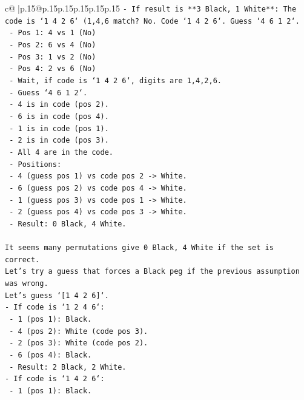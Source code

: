 \documentclass{article}
\begin{document}
{\begin{supertabular}{c@{$\;$}|p{.15\linewidth}@{}p{.15\linewidth}p{.15\linewidth}p{.15\linewidth}p{.15\linewidth}p{.15\linewidth}}
{{{\texttt{{-} If result is **3 Black, 1 White**: The code is `1 4 2 6` (1,4,6 match? No. Code `1 4 2 6`. Guess `4 6 1 2`.} \\
\texttt{  {-} Pos 1: 4 vs 1 (No)} \\
\texttt{  {-} Pos 2: 6 vs 4 (No)} \\
\texttt{  {-} Pos 3: 1 vs 2 (No)} \\
\texttt{  {-} Pos 4: 2 vs 6 (No)} \\
\texttt{  {-} Wait, if code is `1 4 2 6`, digits are 1,4,2,6.} \\
\texttt{  {-} Guess `4 6 1 2`.} \\
\texttt{  {-} 4 is in code (pos 2).} \\
\texttt{  {-} 6 is in code (pos 4).} \\
\texttt{  {-} 1 is in code (pos 1).} \\
\texttt{  {-} 2 is in code (pos 3).} \\
\texttt{  {-} All 4 are in the code.} \\
\texttt{  {-} Positions:} \\
\texttt{    {-} 4 (guess pos 1) vs code pos 2 {-}> White.} \\
\texttt{    {-} 6 (guess pos 2) vs code pos 4 {-}> White.} \\
\texttt{    {-} 1 (guess pos 3) vs code pos 1 {-}> White.} \\
\texttt{    {-} 2 (guess pos 4) vs code pos 3 {-}> White.} \\
\texttt{  {-} Result: 0 Black, 4 White.} \\
\\ 
\texttt{It seems many permutations give 0 Black, 4 White if the set is correct.} \\
\texttt{Let's try a guess that forces a Black peg if the previous assumption was wrong.} \\
\texttt{Let's guess `{[}1 4 2 6{]}`.} \\
\texttt{{-} If code is `1 2 4 6`:} \\
\texttt{  {-} 1 (pos 1): Black.} \\
\texttt{  {-} 4 (pos 2): White (code pos 3).} \\
\texttt{  {-} 2 (pos 3): White (code pos 2).} \\
\texttt{  {-} 6 (pos 4): Black.} \\
\texttt{  {-} Result: 2 Black, 2 White.} \\
\texttt{{-} If code is `1 4 2 6`:} \\
\texttt{  {-} 1 (pos 1): Black.} \\
}}}
\end{supertabular}}
\end{document}

